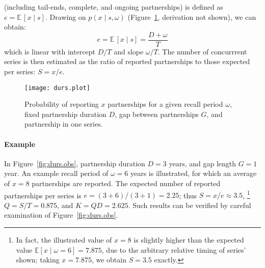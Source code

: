 (including tail-ends, complete, and ongoing partnerships)
is defined as $e = \mathbb{E}\,[x\mid s]$.
Drawing on $p(x \mid s,\omega)$ (Figure~\ref{fig:durs.plot}, derivation not shown), we can obtain:
\begin{equation}\label{eq:e.dur}
  e = \mathbb{E}\,[x\mid s] = \frac{D + \omega}{T}
\end{equation}
which is linear with intercept $D/T$ and slope $\omega/T$.
The number of concurrrent series is then estimated as the ratio of reported partnerships
to those expected per series: $S = x/e$.
\begin{figure}
  \centering
  \texttt{[image: durs.plot]}
  \caption{Probability of reporting $x$ partnerships for a given recall period $\omega$,
    fixed partnership duration $D$, gap between partnerships $G$, and partnership in one series.}
  \label{fig:durs.plot}
\end{figure}
\paragraph{Example}
In Figure~\ref{fig:durs.obs},
partnership duration $D = 3$ years, and gap length $G = 1$ year.
An example recall period of $\omega = 6$ years is illustrated,
for which an average of $x = 8$ partnerships are reported.
The expected number of reported partnerships per series is $e = (3+6)/(3+1) = 2.25$;
thus $S = x/e \approx 3.5$,%
\footnote{In fact, the illustrated value of $x = 8$ is slightly higher than
  the expected value $\mathbb{E}[x \mid \omega = 6] = 7.875$,
  due to the arbitrary relative timing of series' shown;
  taking $x = 7.875$, we obtain $S = 3.5$ exactly.}
$Q = S/T = 0.875$, and $K = QD = 2.625$.
Such results can be verified by careful examination of Figure~\ref{fig:durs.obs}.
